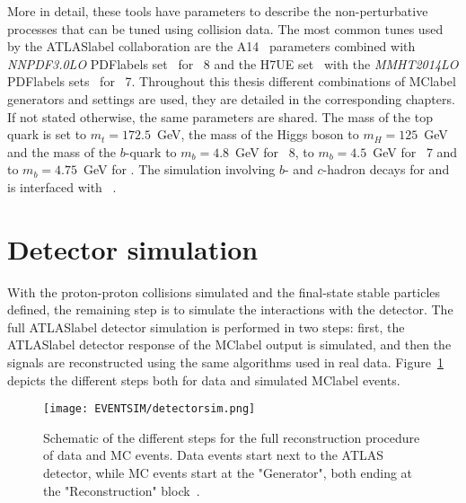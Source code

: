More in detail, these tools have parameters to describe the non-perturbative processes that can be tuned using collision data. The most common tunes used by the \acrshort{ATLASlabel} collaboration are the A14~\cite{ATL-PHYS-PUB-2014-021} parameters combined with \textit{NNPDF3.0LO} \acrshort{PDFlabel}s set~\cite{BALL2013244} for \PYTHIA~8 and the H7UE set~\cite{Bellm2016} with the \textit{MMHT2014LO} \acrshort{PDFlabel}s sets~\cite{Harland-Lang2015} for \HERWIG~7. Throughout this thesis different combinations of \acrshort{MClabel} generators and settings are used, they are detailed in the corresponding chapters. If not stated otherwise, the same parameters are shared. The mass of the top quark is set to $m_t=172.5$~GeV, the mass of the Higgs boson to $m_H=125$~GeV and the mass of the $b$-quark to $m_b=4.8$~GeV for \PYTHIA~8, to $m_b=4.5$~GeV for \HERWIG~7 and to $m_b=4.75$~GeV for \SHERPA. The simulation involving $b$- and $c$-hadron decays for \PYTHIA and \HERWIG is interfaced with \EVTGEN~\cite{LANGE2001152}. 

\section{Detector simulation}

With the proton-proton collisions simulated and the final-state stable particles defined, the remaining step is to simulate the interactions with the detector. The full \acrshort{ATLASlabel} detector simulation is performed in two steps: first, the \acrshort{ATLASlabel} detector response of the \acrshort{MClabel} output is simulated, and then the signals are reconstructed using the same algorithms used in real data. Figure~\ref{figEVNTSIM:detectorsim} depicts the different steps both for data and simulated \acrshort{MClabel} events.

\begin{figure}[htbp]
    \RawFloats
    \begin{center}
    \texttt{[image: EVENTSIM/detectorsim.png]}
    \caption{
        Schematic of the different steps for the full reconstruction procedure of data and MC events. Data events start next to the ATLAS detector, while MC events start at the "Generator", both ending at the "Reconstruction" block~\cite{Aad_2010}.}
    \label{figEVNTSIM:detectorsim}
    \end{center}
\end{figure}

